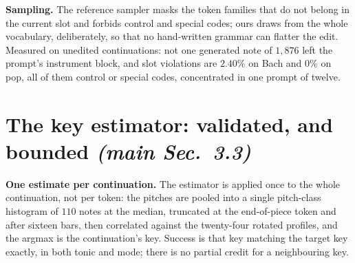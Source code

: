 \documentclass{article}
\begin{document}
\textbf{Sampling.} The reference sampler masks the token families that do not belong in
the current slot and forbids control and special codes; ours draws from the whole
vocabulary, deliberately, so that no hand-written grammar can flatter the edit.
Measured on unedited continuations: not one generated note of $1{,}876$ left the
prompt's instrument block, and slot violations are $2.40\%$ on Bach and $0\%$ on pop,
all of them control or special codes, concentrated in one prompt of twelve.

\section{The key estimator: validated, and bounded \normalfont\textit{(main Sec.~3.3)}}
\label{sec:estimator-ceiling}
%

\textbf{One estimate per continuation.} The estimator is applied once to the whole
continuation, not per token: the pitches are pooled into a single pitch-class
histogram of $110$ notes at the median, truncated at the end-of-piece token and after
sixteen bars, then correlated against the twenty-four rotated profiles, and the argmax is
the continuation's key. Success is that key matching the target key exactly, in both
tonic and mode; there is no partial credit for a neighbouring key.
\end{document}
